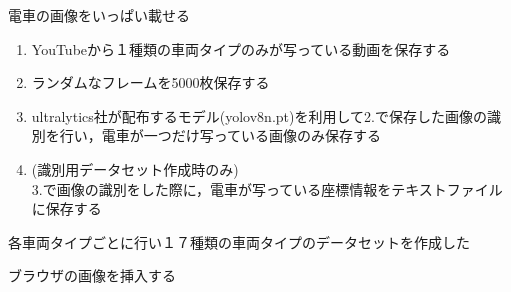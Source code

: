 \usepackage{subcaption}
\usepackage{comment}



\maketitle %
\addtocounter{page}{1}
\thispagestyle{myfirstpage}

\begin{comment}
 \foilhead{\Large 1. はじめに -- 背景と目的 -- \\ 建前編}
\begin{itemize}
 \item 現在，何が問題か（あるいは将来，何が問題になるか）を書く．\\
 世の中には似たようなものがたくさん存在している（動物や車，植物など）
 詳しく知ろうとしたときに，今見ているものが何なのか判別するまでに大きな労力が必要とされている．
 \item その問題に対処するためには，どのようなものがあればよいか（あるいは取り組みが必要）かを書く．\\
 知りたいと思っているモノの写真から，それが何なのか判別できるシステムがあればこれまでよりも簡単に知ることができる．
 \item 本プロジェクトでは何を使ってどんなものを作っているかを書く．\\
 本プロジェクトではYOLOv8を用いて，モノの識別をするシステムの開発を行う
\end{itemize}
\newpage
\end{comment}
電車の画像をいっぱい載せる

\begin{enumerate}
	\item YouTubeから１種類の車両タイプのみが写っている動画を保存する
	\item ランダムなフレームを5000枚保存する
	\item ultralytics社が配布するモデル(yolov8n.pt)を利用して2.で保存した画像の識別を行い，電車が一つだけ写っている画像のみ保存する
	\item  (識別用データセット作成時のみ)\\3.で画像の識別をした際に，電車が写っている座標情報をテキストファイルに保存する
\end{enumerate}
各車両タイプごとに行い１７種類の車両タイプのデータセットを作成した

ブラウザの画像を挿入する

